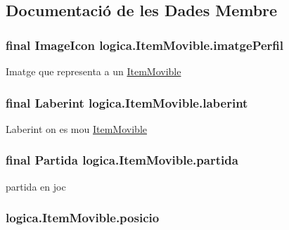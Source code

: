 \subsection{Documentació de les Dades Membre}
\hypertarget{classlogica_1_1_item_movible_a156a60365745803d0d3298b83aeacb73}{
\subsubsection[{imatge\+Perfil}]{\setlength{\rightskip}{0pt plus 5cm}final Image\+Icon logica.\+Item\+Movible.\+imatge\+Perfil}}\label{classlogica_1_1_item_movible_a156a60365745803d0d3298b83aeacb73}
Imatge que representa a un \hyperlink{classlogica_1_1_item_movible}{Item\+Movible} \hypertarget{classlogica_1_1_item_movible_a97036130b7376d77776427ca126f6fb5}{
\subsubsection[{laberint}]{\setlength{\rightskip}{0pt plus 5cm}final {\bf Laberint} logica.\+Item\+Movible.\+laberint\hspace{0.3cm}{\ttfamily [protected]}}}\label{classlogica_1_1_item_movible_a97036130b7376d77776427ca126f6fb5}
Laberint on es mou \hyperlink{classlogica_1_1_item_movible}{Item\+Movible} \hypertarget{classlogica_1_1_item_movible_ace55b4918a7f671f89ed3109c91359e4}{
\subsubsection[{partida}]{\setlength{\rightskip}{0pt plus 5cm}final {\bf Partida} logica.\+Item\+Movible.\+partida\hspace{0.3cm}{\ttfamily [protected]}}}\label{classlogica_1_1_item_movible_ace55b4918a7f671f89ed3109c91359e4}
partida en joc \hypertarget{classlogica_1_1_item_movible_a9380636109f2180b48ee96e64de319a4}{
\subsubsection[{posicio}]{ logica.\+Item\+Movible.\+posicio\hspace{0.3cm}{\ttfamily [protected]}}}\label{classlogica_1_1_item_movible_a9380636109f2180b48ee96e64de319a4}

